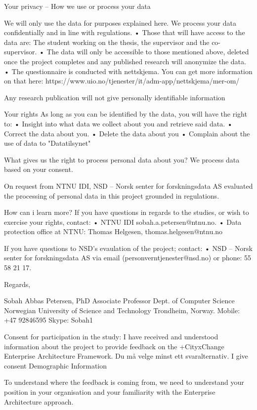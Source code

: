 Your privacy – How we use or process your data

We will only use the data for purposes explained here. We process your data confidentially and in line with regulations.
    • Those that will have access to the data are: The student working on the thesis, the supervisor and the co-supervisor.    
    • The data will only be accessible to those mentioned above, deleted once the project completes and any published research  will anonymize the data.
    • The questionnaire is conducted with nettskjema. You can get more information on that here: https://www.uio.no/tjenester/it/adm-app/nettskjema/mer-om/

Any research publication will not give personally identifiable information

Your rights
As long as you can be identified by the data, you will have the right to:
    • Insight into what data we collect about you and retrieve said data.
    • Correct the data about you.
    • Delete the data about you
    • Complain about the use of data to "Datatilsynet"

What gives us the right to process personal data about you?
We process data based on your consent.

On request from NTNU IDI, NSD – Norsk senter for forskningsdata AS evaluated the processing of personal data in this project grounded in regulations.
 

How can i learn more?
If you have questions in regards to the studies, or wish to exercise your rights, contact:
    • NTNU IDI sobah.a.petersen@ntnu.no.
    • Data protection office at NTNU: Thomas Helgesen, thomas.helgesen@ntnu.no

If you have questions to NSD's evaulation of the project; contact:
    • NSD – Norsk senter for forskningsdata AS via email (personverntjenester@nsd.no) or phone: 55 58 21 17.


Regards,


Sobah Abbas Petersen, PhD
Associate Professor
Dept. of Computer Science
Norwegian University of Science and Technology
Trondheim, Norway.
Mobile: +47 92846595
Skype: Sobah1

Consent for participation in the study: I have received and understood information about the project to provide feedback on the +CityxChange Enterprise Architecture Framework.
Du må velge minst ett svaralternativ.
I give consent
Demographic Information

To understand where the feedback is coming from, we need to understand your position in your organisation and your familiarity with the Enterprise Architecture approach.

